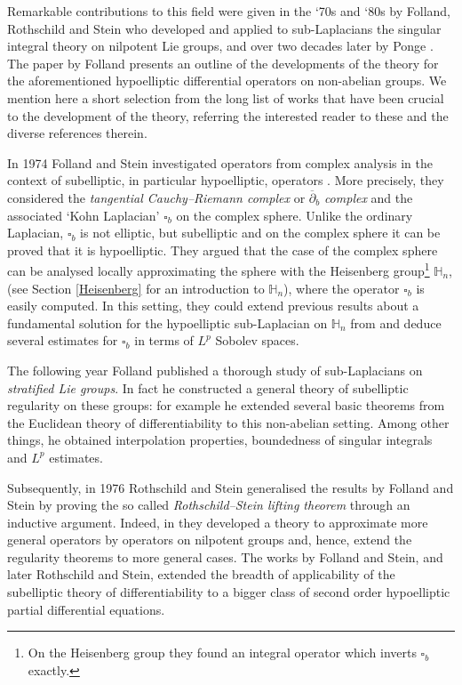 \documentclass[12pt,oneside,a4paper]{book}
\numberwithin{equation}{section}     %
\theoremstyle{plain}
\theoremstyle{definition}
\newcommand{\h}{{\mathbb H}}
\begin{document}
Remarkable contributions to this field were given in the `70s and `80s by Folland, Rothschild and Stein who developed and applied to sub-Laplacians the singular integral theory on nilpotent Lie groups, and over two decades later by Ponge \cite{P2008}. The paper by Folland \cite{F1977} presents an outline of the developments of the theory for the aforementioned hypoelliptic differential operators on non-abelian groups. We mention here a short selection from the long list of works that have been crucial to the development of the theory, referring the interested reader to these and the diverse references therein.

In 1974 Folland and Stein investigated operators from complex analysis in the context of subelliptic, in particular hypoelliptic, operators \cite{FS-CPAM}. More precisely, they considered the \textit{tangential Cauchy--Riemann complex} or $\overline{\partial}_b$ \textit{complex} and the associated `Kohn Laplacian' $\square_b$ on the complex sphere. Unlike the ordinary Laplacian, $\square_b$ is not elliptic, but subelliptic and on the complex sphere it can be proved that it is hypoelliptic. They argued that the case of the complex sphere can be analysed locally approximating the sphere with the Heisenberg group\footnote{On the Heisenberg group they found an integral operator which inverts $\square_b$ exactly.} $\h_n$, (see Section \ref{Heisenberg} for an introduction to $\h_n$), where the operator $\square_b$ is easily computed. In this setting, they could extend previous results about a fundamental solution for the hypoelliptic sub-Laplacian on $\h_n$ from \cite{F1973} and deduce several estimates for $\square_b$ in terms of $L^p$ Sobolev spaces.  

The following year Folland published a thorough study \cite{F75} of sub-Laplacians on \textit{stratified Lie groups}. In fact he constructed a general theory of subelliptic regularity on these groups: for example he extended several basic theorems from the Euclidean theory of differentiability to this non-abelian setting. Among other things, he obtained interpolation properties, boundedness of singular integrals and $L^p$ estimates.  

Subsequently, in 1976  Rothschild and Stein generalised the results by Folland and Stein by proving the so called \textit{Rothschild--Stein lifting theorem} through an inductive argument. Indeed, in \cite{Rothschild-Stein:AM-1976} they developed a theory to approximate more general operators by operators on nilpotent groups and, hence, extend the regularity theorems to more general cases. The works by Folland and Stein, and later Rothschild and Stein, extended the breadth of applicability of the subelliptic theory of differentiability to a bigger class of second order hypoelliptic partial differential equations.
\end{document}
